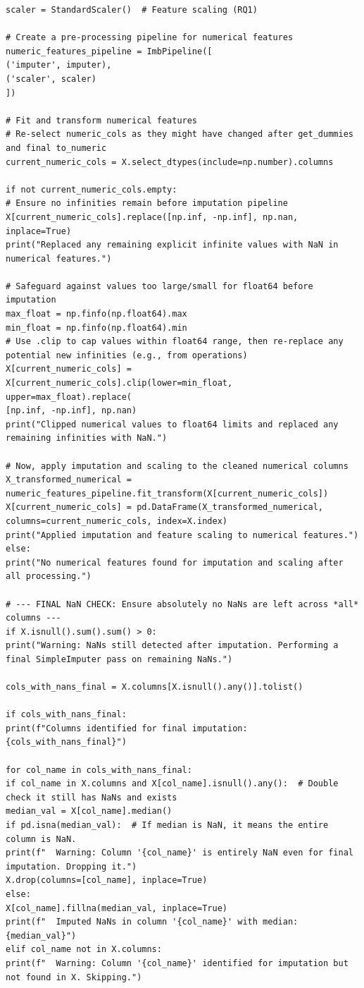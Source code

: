 \begin{lstlisting}[caption={Complete pipeline of XGBoost using CIC-IDS2017 in NIDS using Python}, label={lst:python-pipeline}]
scaler = StandardScaler()  # Feature scaling (RQ1)

# Create a pre-processing pipeline for numerical features
numeric_features_pipeline = ImbPipeline([
('imputer', imputer),
('scaler', scaler)
])

# Fit and transform numerical features
# Re-select numeric_cols as they might have changed after get_dummies and final to_numeric
current_numeric_cols = X.select_dtypes(include=np.number).columns

if not current_numeric_cols.empty:
# Ensure no infinities remain before imputation pipeline
X[current_numeric_cols].replace([np.inf, -np.inf], np.nan, inplace=True)
print("Replaced any remaining explicit infinite values with NaN in numerical features.")

# Safeguard against values too large/small for float64 before imputation
max_float = np.finfo(np.float64).max
min_float = np.finfo(np.float64).min
# Use .clip to cap values within float64 range, then re-replace any potential new infinities (e.g., from operations)
X[current_numeric_cols] = X[current_numeric_cols].clip(lower=min_float, upper=max_float).replace(
[np.inf, -np.inf], np.nan)
print("Clipped numerical values to float64 limits and replaced any remaining infinities with NaN.")

# Now, apply imputation and scaling to the cleaned numerical columns
X_transformed_numerical = numeric_features_pipeline.fit_transform(X[current_numeric_cols])
X[current_numeric_cols] = pd.DataFrame(X_transformed_numerical, columns=current_numeric_cols, index=X.index)
print("Applied imputation and feature scaling to numerical features.")
else:
print("No numerical features found for imputation and scaling after all processing.")

# --- FINAL NaN CHECK: Ensure absolutely no NaNs are left across *all* columns ---
if X.isnull().sum().sum() > 0:
print("Warning: NaNs still detected after imputation. Performing a final SimpleImputer pass on remaining NaNs.")

cols_with_nans_final = X.columns[X.isnull().any()].tolist()

if cols_with_nans_final:
print(f"Columns identified for final imputation: {cols_with_nans_final}")

for col_name in cols_with_nans_final:
if col_name in X.columns and X[col_name].isnull().any():  # Double check it still has NaNs and exists
median_val = X[col_name].median()
if pd.isna(median_val):  # If median is NaN, it means the entire column is NaN.
print(f"  Warning: Column '{col_name}' is entirely NaN even for final imputation. Dropping it.")
X.drop(columns=[col_name], inplace=True)
else:
X[col_name].fillna(median_val, inplace=True)
print(f"  Imputed NaNs in column '{col_name}' with median: {median_val}")
elif col_name not in X.columns:
print(f"  Warning: Column '{col_name}' identified for imputation but not found in X. Skipping.")


\end{lstlisting}
